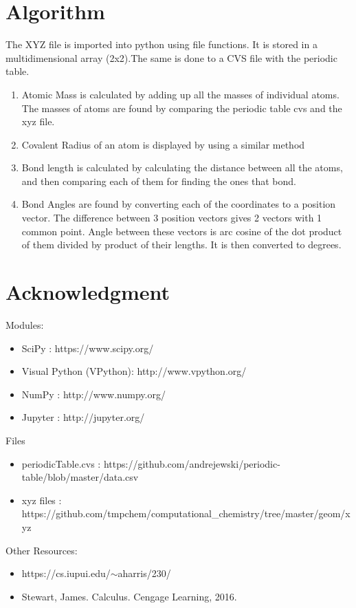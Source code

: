 \documentclass{article}[12pt]
\begin{document}
	\section{Algorithm}
	The XYZ file is imported into python using file functions. It is stored in a multidimensional array (2x2).The same is done to a CVS file with the periodic table. 
	\begin{enumerate}
		\item
		Atomic Mass is calculated by adding up all the masses of individual atoms. The masses of atoms are found by comparing the periodic table cvs and the xyz file. 
		\item 
		Covalent Radius of an atom is displayed by using a similar method
		\item 
		Bond length is calculated by calculating the distance between all the atoms, and then comparing each of them for finding the ones that bond.
		\item 
		Bond Angles are found by converting each of the coordinates to a position vector. The difference between 3 position vectors gives 2 vectors with 1 common point. Angle between these vectors is arc cosine of the dot product of them divided by product of their lengths. It is then converted to degrees.
	\end{enumerate}
	\section{Acknowledgment}

	Modules:
	\begin{itemize}
		\item SciPy : https://www.scipy.org/
		\item Visual Python (VPython): http://www.vpython.org/
		\item NumPy : http://www.numpy.org/
		\item Jupyter : http://jupyter.org/
	\end{itemize}
	Files
	\begin{itemize}
		\item periodicTable.cvs : https://github.com/andrejewski/periodic-table/blob/master/data.csv
		\item xyz files : https://github.com/tmpchem/computational\_chemistry/tree/master/geom/xyz
	\end{itemize}
	Other Resources:
\begin{itemize}
	\item 	https://cs.iupui.edu/$\sim$aharris/230/
	\item	Stewart, James. Calculus. Cengage Learning, 2016.
\end{itemize}
	
	
	
	
	 
	

	
	
\end{document}
